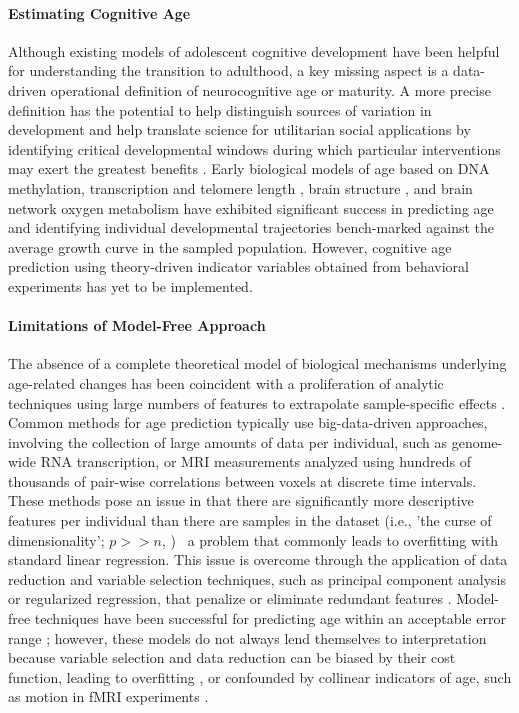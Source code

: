 \documentclass{article}%
\begin{document}
\paragraph*{Estimating Cognitive Age}
Although existing models of adolescent cognitive development have been helpful for understanding the transition to adulthood, a key missing aspect is a data-driven operational definition of neurocognitive age or maturity. A more precise definition has the potential to help distinguish sources of variation in development and help translate science for utilitarian social applications by identifying critical developmental windows during which particular interventions may exert the greatest benefits \citep{somerville2016searching}. Early biological models of age based on DNA methylation, transcription and telomere length \citep{baker1988biomarkers, jylhava2017biological}, brain structure \citep{khundrakpam2015prediction,aycheh2018biological,madan2018predicting}, and brain network oxygen metabolism \citep{dosenbach2010prediction, qin2015predicting} have exhibited significant success in predicting age and identifying individual developmental trajectories bench-marked against the average growth curve in the sampled population. However, cognitive age prediction using theory-driven indicator variables obtained from behavioral experiments has yet to be implemented. 
%
\paragraph*{Limitations of Model-Free Approach} 
The absence of a complete theoretical model of biological mechanisms underlying age-related changes has been coincident with a proliferation of analytic techniques using large numbers of features to extrapolate sample-specific effects \citep{sagers2020prediction,crimmins2008biomarkers}. Common methods for age prediction typically use big-data-driven approaches, involving the collection of large amounts of data per individual, such as genome-wide RNA transcription, or MRI measurements analyzed using hundreds of thousands of pair-wise correlations between voxels at discrete time intervals. These methods pose an issue in that there are significantly more descriptive features per individual than there are samples in the dataset (i.e., 'the curse of dimensionality'; $p >> n$, \cite{taylor2019}) \textemdash \ a problem that commonly leads to overfitting with standard linear regression. This issue is overcome through the application of data reduction and variable selection techniques, such as principal component analysis or regularized regression, that penalize or eliminate redundant features \citep{lee2017medical}. Model-free techniques have been successful for predicting age within an acceptable error range \citep{cole2017predicting}; however, these models do not always lend themselves to interpretation because variable selection and data reduction can be biased by their cost function, leading to overfitting \citep{babyak2004you}, or confounded by collinear indicators of age, such as motion in fMRI experiments \citep{satterthwaite2013heterogeneous}.
%
\end{document}
